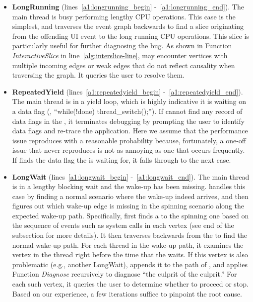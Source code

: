 \begin{itemize}
	\item \textbf{LongRunning} (lines~\ref{a1:longrunning_begin}
		-~\ref{a1:longrunning_end}). The main thread is busy performing lengthy
		CPU operations. This case is the simplest, and \xxx traverses the event
		graph backwards to find a slice originating from the offending UI event
		to the long running CPU operations. This slice is particularly useful for
		further diagnosing the bug. As shown in Function \textit{InteractiveSlice} in
		line~\ref{alg:interslice-line}, \xxx may encounter vertices with multiple
		incoming edges or weak edges that do not reflect causality when traversing
		the graph. It queries the user to resolve them.

	\item \textbf{RepeatedYield} (lines~\ref{a1:repeatedyield_begin}
		-~\ref{a1:repeatedyield_end}). The main thread is in a yield loop, which
		is highly indicative it is waiting on a data flag (\eg, ``while(!done)
		thread\_switch();''). If \xxx cannot find any record of data flags in the
		\spinningnode, it terminates debugging by prompting the user to identify data
		flags and re-trace the application. Here we assume that the performance issue
		reproduces with a reasonable probability because, fortunately, a one-off issue
		that never reproduces is not as annoying as one that occurs frequently. If
		\xxx finds the data flag the \spinningnode is waiting for, it falls through to
		the next case.

	\item \textbf{LongWait} (lines~\ref{a1:longwait_begin}
		-~\ref{a1:longwait_end}). The main thread is in a lengthy blocking wait and
		the wake-up has been missing. \xxx handles this case by finding a normal
		scenario where the wake-up indeed arrives, and then figures out which wake-up
		edge is missing in the spinning scenario along the expected wake-up path.
                Specifically, \xxx first finds a \similarnode to the spinning one based
		on the sequence of events such as system calls in each vertex (see end of the
                subsection for more details). It then traverses backwards from the \similarnode
                to find the normal wake-up path. For each thread in the wake-up path, it examines
                the vertex in the thread right before the time that the \spinningnode waits. If this
                vertex is also problematic (e.g., another LongWait), \xxx appends it to the path of
                \rootcausenodes, and applies
                Function \textit{Diagnose} recursively to diagnose ``the culprit of the culprit.''
                For each such vertex, it queries the user to determine whether to proceed or stop.
                Based on our experience, a few iterations suffice to pinpoint the root cause.

\end{itemize}

